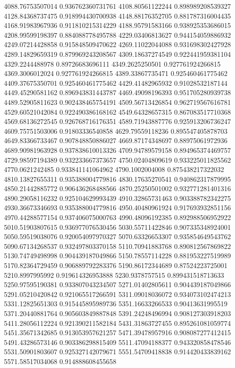 {4088.76753507014 0.936762360731761
4108.80561122244 0.898989208539327
4128.84368737475 0.918994430700938
4148.88176352705 0.881787316004435
4168.91983967936 0.911810215314229
4188.95791583166 0.938925353686015
4208.99599198397 0.884088778495788
4229.03406813627 0.944154059886932
4249.07214428858 0.915848509470622
4269.11022044088 0.931698302427928
4289.14829659319 0.879969243208567
4309.18637274549 0.922441959381104
4329.2244488978 0.89726683696111
4349.2625250501 0.927761924266815
4369.3006012024 0.927761924266815
4389.33867735471 0.925460461775462
4409.37675350701 0.925460461775462
4429.41482965932 0.91028532187144
4449.45290581162 0.896943831443787
4469.49098196393 0.951705280939738
4489.52905811623 0.902438465754191
4509.56713426854 0.962719567616781
4529.60521042084 0.922490386168162
4549.64328657315 0.867083517710368
4569.68136272545 0.926768716176351
4589.71943887776 0.925913206736247
4609.75751503006 0.91803336540858
4629.79559118236 0.895547405878703
4649.83366733467 0.907848850886027
4669.87174348697 0.88975061972936
4689.90981963928 0.937838610013326
4709.94789579158 0.894965374469757
4729.98597194389 0.932233667373657
4750.02404809619 0.933225011825562
4770.0621242485 0.933841141064962
4790.1002004008 0.875438217322032
4810.13827655311 0.935388004779816
4830.17635270541 0.940862317879995
4850.21442885772 0.906436268488566
4870.25250501002 0.932771281401316
4890.29058116232 0.925104629993439
4910.32865731463 0.903388782342275
4930.36673346693 0.935388004779816
4950.40480961924 0.917693932851156
4970.44288577154 0.937406075000763
4990.48096192385 0.892988506952922
5010.51903807615 0.936977076530456
5030.55711422846 0.907335348924001
5050.59519038076 0.920054097970327
5070.63326653307 0.935854649543762
5090.67134268537 0.932497803370158
5110.70941883768 0.890812567869822
5130.74749498998 0.904439187049866
5150.78557114228 0.881953227519989
5170.82364729459 0.906889792283376
5190.86172344689 0.87524223725001
5210.8997995992 0.919614326953888
5230.9378757515 0.899431518713633
5250.97595190381 0.933807043234507
5271.01402805611 0.904439187049866
5291.05210420842 0.921065517266591
5311.09018036072 0.934073102474213
5331.12825651303 0.915445895989736
5351.16633266533 0.90413631995519
5371.20440881764 0.905603849887848
5391.24248496994 0.908127303918203
5411.28056112224 0.921390211582184
5431.31863727455 0.895261081059774
5451.35671342685 0.913053957621257
5471.39478957916 0.908087277412415
5491.43286573146 0.903386298815409
5511.47094188377 0.943320858478546
5531.50901803607 0.925327142079671
5551.54709418838 0.914420433839162
5571.58517034068 0.914888608455658
}
